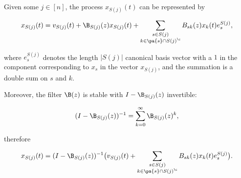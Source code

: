 \begin{lemma}
  \label{lem:scc_expansion}
  Given some $j \in [n]$, the process $x_{S(j)}(t)$ can be represented
  by

  \begin{equation}
    \label{eqn:scc_parent_expansion}
    x_{S(j)}(t) = v_{S(j)}(t) + \B_{S(j)}(z)x_{S(j)}(t) + \sum_{\substack{s \in S(j) \\ k \in \pa{s} \cap S(j)^\c}} B_{sk}(z)x_k(t)e_s^{S(j)},
  \end{equation}

  where $e_s^{S(j)}$ denotes the length $|S(j)|$ canonical basis
  vector with a $1$ in the component corresponding to $x_s$ in the
  vector $x_{S(j)}$, and the summation is a double sum on $s$ and $k$.

  Moreover, the filter $\B(z)$ is stable with $I - \B_{S(j)}(z)$
  invertible:

  \begin{equation}
    \label{eqn:scc_inversion}
    (I - \B_{S(j)}(z))^{-1} = \sum_{k = 0}^\infty \B_{S(j)}(z)^k,
  \end{equation}

  therefore

  \begin{equation}
    \label{eqn:scc_parent_expansion_inverted}
    x_{S(j)}(t) = (I - \B_{S(j)}(z))^{-1} \big(v_{S(j)}(t) + \sum_{\substack{s \in S(j) \\ k \in \pa{s} \cap S(j)^\c}} B_{sk}(z)x_k(t)e_s^{S(j)}\big).
  \end{equation}
  
\end{lemma}
